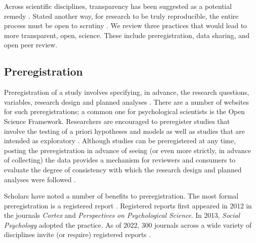 \documentclass[
  11pt,
]{book}
\begin{document}
Across scientific disciplines, transparency has been suggested as a potential remedy \citep{open_science_collaboration_estimating_2015, vant_veer_pre-registration_2016}. Stated another way, for research to be truly reproducible, the entire process must be open to scrutiny \citep{stevens_replicability_2017}. We review three practices that would lead to more transparent, open, science. These include preregistration, data sharing, and open peer review.

\hypertarget{preregistration}{%
\subsection{Preregistration}\label{preregistration}}

Preregistration of a study involves specifying, in advance, the research questions, variables, research design and planned analyses \citep{stevens_replicability_2017}. There are a number of websites for such preregistrations; a common one for psychological scientists is the Open Science Framework. Researchers are encouraged to preregister studies that involve the testing of a priori hypotheses and models as well as studies that are intended as exploratory \citep{bosnjak_template_2021}. Although studies can be preregistered at any time, posting the preregistration in advance of seeing (or even more strictly, in advance of collecting) the data provides a mechanism for reviewers and consumers to evaluate the degree of consistency with which the research design and planned analyses were followed \citep{bosnjak_template_2021, haven_preregistering_2020}.

Scholars have noted a number of benefits to preregistration. The most formal preregistration is a registered report \citep{osf_open_2022}. Registered reports first appeared in 2012 in the journals \emph{Cortex} and \emph{Perspectives on Psychological Science}. In 2013, \emph{Social Psychology} adopted the practice. As of 2022, 300 journals across a wide variety of disciplines invite (or require) registered reports \citep{chambers_past_2022}.
\end{document}
